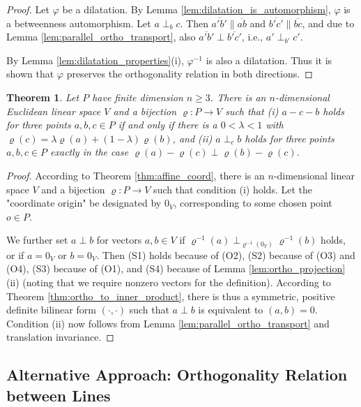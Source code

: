 \documentclass[11pt,a4paper]{article}
\newcommand{\betw}[3]{#1 - #2 - #3}
\newcommand{\ortho}[3]{#1 \perp_{#2} #3}
\newcommand{\lineab}[1]{\overline{#1}}
\newtheorem{theorem}{Theorem}[section]
\begin{document}
\begin{proof}
Let $\varphi$ be a dilatation. By Lemma \ref{lem:dilatation_is_automorphism}, $\varphi$ is a betweenness automorphism. Let $\ortho{a}{b}{c}$. Then $\lineab{a'b'} \parallel \lineab{ab}$ and $\lineab{b'c'} \parallel \lineab{bc}$, and due to Lemma \ref{lem:parallel_ortho_transport}, also $\lineab{a'b'} \perp \lineab{b'c'}$, i.e., $\ortho{a'}{b'}{c'}$.

By Lemma \ref{lem:dilatation_properties}(i), $\varphi^{-1}$ is also a dilatation. Thus it is shown that $\varphi$ preserves the orthogonality relation in both directions.
\end{proof}

\begin{theorem} \label{thm:euclidean_coord}
Let $P$ have finite dimension $n \ge 3$. There is an $n$-dimensional Euclidean linear space $V$ and a bijection $\varrho: P \to V$ such that (i) $\betw{a}{c}{b}$ holds for three points $a, b, c \in P$ if and only if there is a $0 < \lambda < 1$ with $\varrho(c) = \lambda \varrho(a) + (1 - \lambda)\varrho(b)$, and (ii) $\ortho{a}{c}{b}$ holds for three points $a, b, c \in P$ exactly in the case $\varrho(a) - \varrho(c) \perp \varrho(b) - \varrho(c)$.
\end{theorem}

\begin{proof}
According to Theorem \ref{thm:affine_coord}, there is an $n$-dimensional linear space $V$ and a bijection $\varrho: P \to V$ such that condition (i) holds. Let the "coordinate origin" be designated by $0_V$, corresponding to some chosen point $o \in P$.

We further set $a \perp b$ for vectors $a, b \in V$ if $\ortho{\varrho^{-1}(a)}{\varrho^{-1}(0_V)}{\varrho^{-1}(b)}$ holds, or if $a = 0_V$ or $b = 0_V$. Then (S1) holds because of (O2), (S2) because of (O3) and (O4), (S3) because of (O1), and (S4) because of Lemma \ref{lem:ortho_projection}(ii) (noting that we require nonzero vectors for the definition). According to Theorem \ref{thm:ortho_to_inner_product}, there is thus a symmetric, positive definite bilinear form $(\cdot, \cdot)$ such that $a \perp b$ is equivalent to $(a, b) = 0$. Condition (ii) now follows from Lemma \ref{lem:parallel_ortho_transport} and translation invariance.
\end{proof}

\subsection{Alternative Approach: Orthogonality Relation between Lines}
\end{document}
